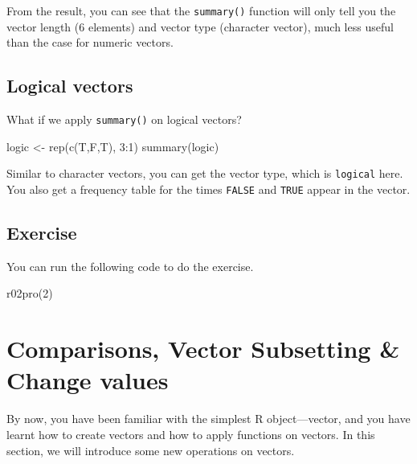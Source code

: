 \documentclass[
]{book}
\newenvironment{Shaded}{\begin{snugshade}}{\end{snugshade}}
\newcommand{\DecValTok}[1]{\textcolor[rgb]{0.00,0.00,0.81}{#1}}
\newcommand{\FunctionTok}[1]{\textcolor[rgb]{0.00,0.00,0.00}{#1}}
\newcommand{\NormalTok}[1]{#1}
\newcommand{\OtherTok}[1]{\textcolor[rgb]{0.56,0.35,0.01}{#1}}
\newcommand{\SpecialCharTok}[1]{\textcolor[rgb]{0.00,0.00,0.00}{#1}}
\begin{document}
From the result, you can see that the \texttt{summary()} function will only tell you the vector length (6 elements) and vector type (character vector), much less useful than the case for numeric vectors.

\hypertarget{logical-vectors-1}{%
\subsection{Logical vectors}\label{logical-vectors-1}}

What if we apply \texttt{summary()} on logical vectors?

\begin{Shaded}
\begin{Highlighting}[]
\NormalTok{logic }\OtherTok{\textless{}{-}} \FunctionTok{rep}\NormalTok{(}\FunctionTok{c}\NormalTok{(T,F,T), }\DecValTok{3}\SpecialCharTok{:}\DecValTok{1}\NormalTok{)}
\FunctionTok{summary}\NormalTok{(logic)}
\end{Highlighting}
\end{Shaded}

Similar to character vectors, you can get the vector type, which is \texttt{logical} here. You also get a frequency table for the times \texttt{FALSE} and \texttt{TRUE} appear in the vector.

\hypertarget{exercise-5}{%
\subsection{Exercise}\label{exercise-5}}

You can run the following code to do the exercise.

\begin{Shaded}
\begin{Highlighting}[]
\FunctionTok{r02pro}\NormalTok{(}\DecValTok{2}\NormalTok{)}
\end{Highlighting}
\end{Shaded}

\hypertarget{comparisons-vector-subsetting-change-values}{%
\section{Comparisons, Vector Subsetting \& Change values}\label{comparisons-vector-subsetting-change-values}}

By now, you have been familiar with the simplest R object---vector, and you have learnt how to create vectors and how to apply functions on vectors. In this section, we will introduce some new operations on vectors.
\end{document}

